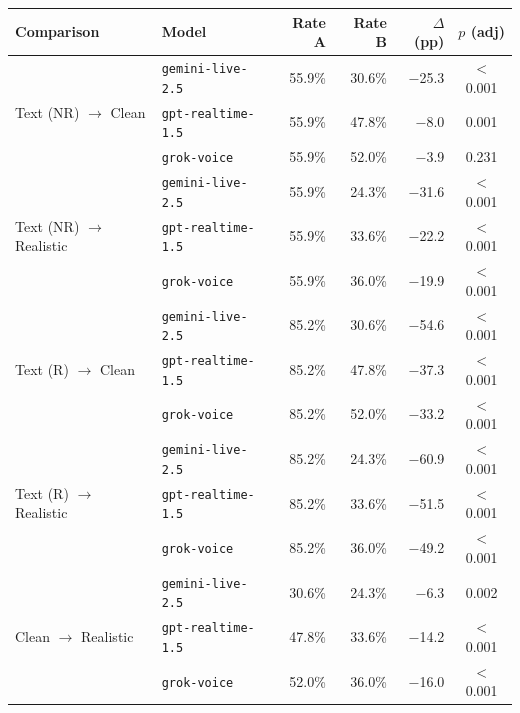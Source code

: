 \begin{tabular}{llrrrc}
\toprule
\textbf{Comparison} & {\color{red!75!black}\textbf{Model}} & \textbf{Rate A} & \textbf{Rate B} & \textbf{$\Delta$ (pp)} & \textbf{$p$ (adj)} \\
\midrule
\multirow{3}{*}{Text (NR) $\to$ Clean} & {\color{red!75!black}\texttt{gemini-live-2.5}} & 55.9\% & 30.6\% & $-$25.3 & $<$0.001 \\
 & {\color{red!75!black}\texttt{gpt-realtime-1.5}} & 55.9\% & 47.8\% & $-$8.0 & 0.001 \\
 & {\color{red!75!black}\texttt{grok-voice}} & 55.9\% & 52.0\% & $-$3.9 & 0.231 \\
\midrule
\multirow{3}{*}{Text (NR) $\to$ Realistic} & {\color{red!75!black}\texttt{gemini-live-2.5}} & 55.9\% & 24.3\% & $-$31.6 & $<$0.001 \\
 & {\color{red!75!black}\texttt{gpt-realtime-1.5}} & 55.9\% & 33.6\% & $-$22.2 & $<$0.001 \\
 & {\color{red!75!black}\texttt{grok-voice}} & 55.9\% & 36.0\% & $-$19.9 & $<$0.001 \\
\midrule
\multirow{3}{*}{Text (R) $\to$ Clean} & {\color{red!75!black}\texttt{gemini-live-2.5}} & 85.2\% & 30.6\% & $-$54.6 & $<$0.001 \\
 & {\color{red!75!black}\texttt{gpt-realtime-1.5}} & 85.2\% & 47.8\% & $-$37.3 & $<$0.001 \\
 & {\color{red!75!black}\texttt{grok-voice}} & 85.2\% & 52.0\% & $-$33.2 & $<$0.001 \\
\midrule
\multirow{3}{*}{Text (R) $\to$ Realistic} & {\color{red!75!black}\texttt{gemini-live-2.5}} & 85.2\% & 24.3\% & $-$60.9 & $<$0.001 \\
 & {\color{red!75!black}\texttt{gpt-realtime-1.5}} & 85.2\% & 33.6\% & $-$51.5 & $<$0.001 \\
 & {\color{red!75!black}\texttt{grok-voice}} & 85.2\% & 36.0\% & $-$49.2 & $<$0.001 \\
\midrule
\multirow{3}{*}{Clean $\to$ Realistic} & {\color{red!75!black}\texttt{gemini-live-2.5}} & 30.6\% & 24.3\% & $-$6.3 & 0.002 \\
 & {\color{red!75!black}\texttt{gpt-realtime-1.5}} & 47.8\% & 33.6\% & $-$14.2 & $<$0.001 \\
 & {\color{red!75!black}\texttt{grok-voice}} & 52.0\% & 36.0\% & $-$16.0 & $<$0.001 \\
\bottomrule
\end{tabular}
